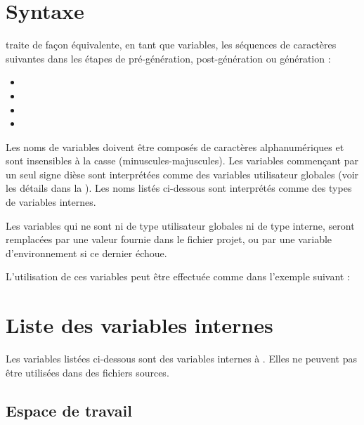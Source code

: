 \section{Syntaxe}

\codeblocks traite de façon équivalente, en tant que variables, les séquences de caractères suivantes dans les étapes de pré-génération, post-génération ou génération :

\begin{itemize}
\item {}
\item {}
\item {}
\item {}
\end{itemize}

Les noms de variables doivent être composés de caractères alphanumériques et sont insensibles à la casse (minuscules-majuscules). Les variables commençant par un seul signe dièse \codeline{(#)} sont interprétées comme des variables utilisateur globales (voir les détails dans la ). Les noms listés ci-dessous sont interprétés comme des types de variables internes.

Les variables qui ne sont ni de type utilisateur globales ni de type interne, seront remplacées par une valeur fournie dans le fichier projet, ou par une variable d'environnement si ce dernier échoue.

L'utilisation de ces variables peut être effectuée comme dans l'exemple suivant :

 \newline
{}


\section{Liste des variables internes}\label{sec:builtin_variables}

Les variables listées ci-dessous sont des variables internes à \codeblocks. Elles ne peuvent pas être utilisées dans des fichiers sources.

\subsection{Espace de travail \codeblocks}

